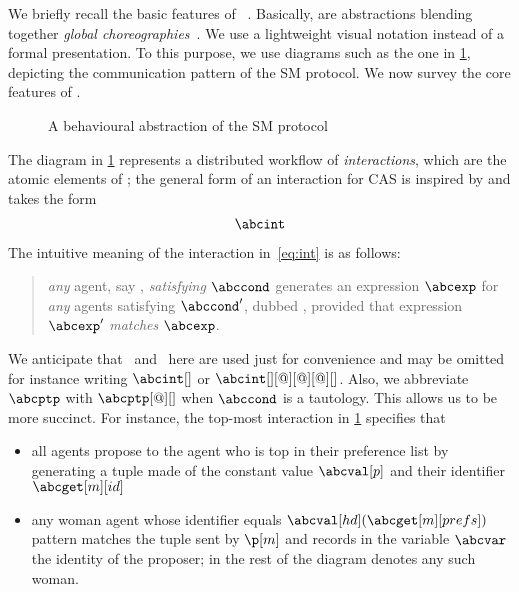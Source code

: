 We briefly recall the basic features of \abcST ~\cite{itt20}.
%
Basically, \abcST are abstractions blending together \emph{global
  choreographies}~\cite{gt18,gt16,bcgmmt19}.
%
We use a lightweight visual notation instead of a formal
presentation.
\hsl
%
To this purpose, we use diagrams such as the one in \cref{fig:smp},
depicting the communication pattern of the SM protocol.
%
We now survey the core features of \abcST.
%
\begin{figure}[t]
  \centering
  \caption{\label{fig:smp}A behavioural abstraction of the SM protocol}
\end{figure}

The diagram in \cref{fig:smp} represents a distributed workflow of
\emph{interactions}, which are the atomic elements of \abcST; the
general form of an interaction for CAS is inspired by \abc and takes
the form
%
\begin{align}\label{eq:int}
  \abcint
\end{align}
The intuitive meaning of the interaction in~\eqref{eq:int} is as
follows:
\begin{quote}
  \emph{any} agent, say \p, \emph{satisfying} $\abccond$ generates an
  expression $\abcexp$ for \emph{any} agents satisfying $\abccond'$,
  dubbed \q, provided that expression $\abcexp'$ \emph{matches}
  $\abcexp$.
\end{quote}
%
We anticipate that \p\ and \q\ here are used just for convenience and
may be omitted for instance writing $\abcint[]$ or
$\abcint[][@][@][@][]$.
%
Also, we abbreviate $\abcptp$ with $\abcptp[@][]$ when $\abccond$ is a
tautology.
%
This allows us to be more succinct.
%
For instance, the top-most interaction in \cref{fig:smp} specifies
that
\begin{itemize}
\item all  agents propose to the  agent who is
  top in their preference list by generating a tuple made of the
  constant value $\abcval[p]$ and their identifier $\abcget[m][id]$
\item any woman agent whose identifier equals
  $\abcval[hd](\abcget[m][prefs])$ pattern matches the tuple sent by
  $\p[m]$ and records in the variable $\abcvar$ the identity of the
  proposer; in the rest of the diagram \p[w] denotes any such woman.
\end{itemize}

